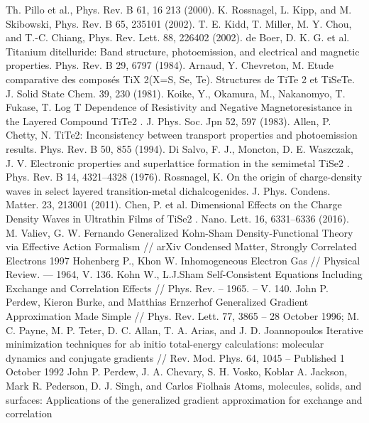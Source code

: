 \begin{thebibliography}{3}
Th. Pillo et al., Phys. Rev. B 61, 16 213 (2000).
K. Rossnagel, L. Kipp, and M. Skibowski, Phys. Rev. B 65, 235101 (2002).
 T. E. Kidd, T. Miller, M. Y. Chou, and T.-C. Chiang, Phys. Rev. Lett. 88, 226402 (2002).
de Boer, D. K. G. et al. Titanium ditelluride: Band structure, photoemission, and electrical and magnetic properties. Phys. Rev. B 29, 6797 (1984).
 Arnaud, Y. Chevreton, M. Etude comparative des composés TiX 2(X=S, Se, Te). Structures de TiTe 2 et TiSeTe. J. Solid State Chem. 39, 230 (1981).
 Koike, Y., Okamura, M., Nakanomyo, T. Fukase, T. Log T Dependence of Resistivity and Negative Magnetoresistance in the Layered Compound TiTe2 . J. Phys. Soc. Jpn 52, 597 (1983).
Allen, P. Chetty, N. TiTe2: Inconsistency between transport properties and photoemission results. Phys. Rev. B 50, 855 (1994).
Di Salvo, F. J., Moncton, D. E. Waszczak, J. V. Electronic properties and superlattice formation in the semimetal TiSe2 . Phys. Rev. B 14, 4321–4328 (1976).
Rossnagel, K. On the origin of charge-density waves in select layered transition-metal dichalcogenides. J. Phys. Condens. Matter. 23, 213001 (2011).
Chen, P. et al. Dimensional Effects on the Charge Density Waves in Ultrathin Films of TiSe2 . Nano. Lett. 16, 6331–6336 (2016).
 M. Valiev, G. W. Fernando Generalized Kohn-Sham Density-Functional Theory via Effective Action Formalism // arXiv Condensed Matter, Strongly Correlated Electrons 1997 
Hohenberg P., Khon W.  Inhomogeneous Electron Gas // Physical Review. --- 1964, V. 136.
Kohn W., L.J.Sham Self-Consistent Equations Including Exchange and Correlation Effects // Phys. Rev. – 1965. – V. 140.
John P. Perdew, Kieron Burke, and Matthias Ernzerhof Generalized Gradient Approximation Made Simple // Phys. Rev. Lett. 77, 3865 – 28 October 1996;
M. C. Payne, M. P. Teter, D. C. Allan, T. A. Arias, and J. D. Joannopoulos Iterative minimization techniques for ab initio total-energy calculations: molecular dynamics and conjugate gradients // Rev. Mod. Phys. 64, 1045 – Published 1 October 1992
John P. Perdew, J. A. Chevary, S. H. Vosko, Koblar A. Jackson, Mark R. Pederson, D. J. Singh, and Carlos Fiolhais Atoms, molecules, solids, and surfaces: Applications of the generalized gradient approximation for exchange and correlation

\end{thebibliography}
